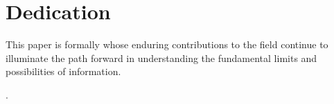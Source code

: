 \documentclass[11pt,twocolumn]{article}
\begin{document}
\section{Dedication}
This paper is formally whose enduring contributions to the field continue to illuminate the path forward in understanding the fundamental limits and possibilities of information.

.
\end{document}
